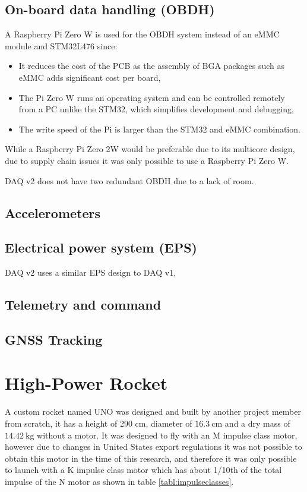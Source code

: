 \documentclass[a4paper,11pt]{article}
\begin{document}
\subsection{On-board data handling (OBDH)}
A Raspberry Pi Zero W is used for the OBDH system instead of an eMMC module and STM32L476 since:
\begin{itemize}
  \item It reduces the cost of the PCB as the assembly of BGA packages such as eMMC adds significant cost per board,
  \item The Pi Zero W runs an operating system and can be controlled remotely from a PC unlike the STM32, which simplifies development and debugging,
  \item The write speed of the Pi is larger than the STM32 and eMMC combination. %
\end{itemize}

While a Raspberry Pi Zero 2W would be preferable due to its multicore design, due to supply chain issues it was only possible to use a Raspberry Pi Zero W.

DAQ v2 does not have two redundant OBDH due to a lack of room.

\subsection{Accelerometers}

\subsection{Electrical power system (EPS)}

DAQ v2 uses a similar EPS design to DAQ v1,

\subsection{Telemetry and command}
\subsection{GNSS Tracking}

\section{High-Power Rocket}

A custom rocket named UNO was designed and built by another project member from scratch, it has a height of 290 cm, diameter of $\SI{16.3}{\centi\meter}$ and a dry mass of $\SI{14.42}{\kilo\gram}$ without a motor. It was designed to fly with an M impulse class motor, however due to changes in United States export regulations it was not possible to obtain this motor in the time of this research, and therefore it was only possible to launch with a K impulse class motor which has about 1/10th of the total impulse of the N motor as shown in table \ref{tabl:impulseclasses}.
\end{document}
